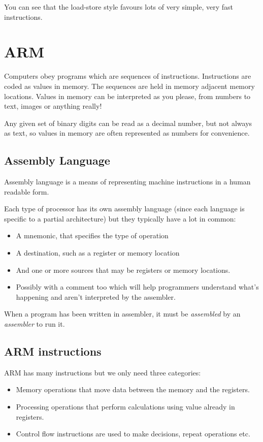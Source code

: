 \documentclass{article}
\begin{document}
You can see that the load-store style favours lots of very simple, very fast instructions.

\section{ARM}
Computers obey programs which are sequences of instructions. Instructions are coded as values in memory. The sequences are held in memory adjacent memory locations. Values in memory can be interpreted as you please, from numbers to text, images or anything really!

Any given set of binary digits can be read as a decimal number, but not always as text, so values in memory are often represented as numbers for convenience.

\subsection{Assembly Language}
Assembly language is a means of representing machine instructions in a human readable form.

Each type of processor has its own assembly language (since each language is specific to a partial architecture) but they typically have a lot in common:

\begin{itemize}
	\item A mnemonic, that specifies the type of operation
	\item A destination, such as a register or memory location
	\item And one or more sources that may be registers or memory locations.
	\item Possibly with a comment too which will help programmers understand what's happening and aren't interpreted by the assembler.
\end{itemize}

When a program has been written in assembler, it must be {\it assembled} by an {\it assembler} to run it.

\subsection{ARM instructions}

ARM has many instructions but we only need three categories:

\begin{itemize}
	\item Memory operations that move data between the memory and the registers.
	\item Processing operations that perform calculations using value already in registers.
	\item Control flow instructions are used to make decisions, repeat operations etc.
\end{itemize}
\end{document}
